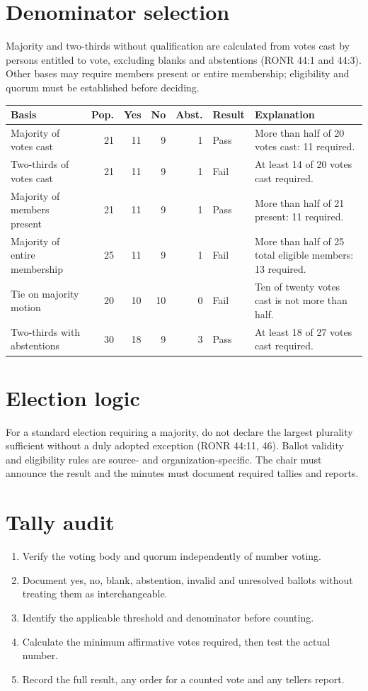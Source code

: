 \documentclass[11pt]{article}
\begin{document}
\SuiteOpen
{}
\section{Denominator selection}
Majority and two-thirds without qualification are calculated from votes cast by persons entitled to vote, excluding blanks and abstentions (RONR 44:1 and 44:3). Other bases may require members present or entire membership; eligibility and quorum must be established before deciding.

\small\begin{longtable}{@{}p{.27\linewidth}rrrrp{.11\linewidth}p{.28\linewidth}@{}}\toprule Basis & Pop. & Yes & No & Abst. & Result & Explanation\\\midrule\endhead
Majority of votes cast & 21 & 11 & 9 & 1 & Pass & More than half of 20 votes cast: 11 required.\\
Two-thirds of votes cast & 21 & 11 & 9 & 1 & Fail & At least 14 of 20 votes cast required.\\
Majority of members present & 21 & 11 & 9 & 1 & Pass & More than half of 21 present: 11 required.\\
Majority of entire membership & 25 & 11 & 9 & 1 & Fail & More than half of 25 total eligible members: 13 required.\\
Tie on majority motion & 20 & 10 & 10 & 0 & Fail & Ten of twenty votes cast is not more than half.\\
Two-thirds with abstentions & 30 & 18 & 9 & 3 & Pass & At least 18 of 27 votes cast required.\\
\bottomrule\end{longtable}\normalsize
\section{Election logic}
For a standard election requiring a majority, do not declare the largest plurality sufficient without a duly adopted exception (RONR 44:11, 46). Ballot validity and eligibility rules are source- and organization-specific. The chair must announce the result and the minutes must document required tallies and reports.

\section{Tally audit}
\begin{enumerate}[leftmargin=*,itemsep=4pt]
\item Verify the voting body and quorum independently of number voting.
\item Document yes, no, blank, abstention, invalid and unresolved ballots without treating them as interchangeable.
\item Identify the applicable threshold and denominator before counting.
\item Calculate the minimum affirmative votes required, then test the actual number.
\item Record the full result, any order for a counted vote and any tellers report.
\end{enumerate}
\end{document}
